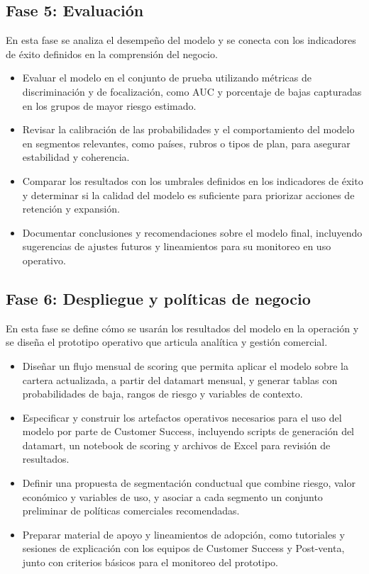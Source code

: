 \subsection{Fase 5: Evaluación}

En esta fase se analiza el desempeño del modelo y se conecta con los indicadores de éxito definidos en la comprensión del negocio.

\begin{itemize}
    \item Evaluar el modelo en el conjunto de prueba utilizando métricas de discriminación y de focalización, como AUC y porcentaje de bajas capturadas en los grupos de mayor riesgo estimado.
    \item Revisar la calibración de las probabilidades y el comportamiento del modelo en segmentos relevantes, como países, rubros o tipos de plan, para asegurar estabilidad y coherencia.
    \item Comparar los resultados con los umbrales definidos en los indicadores de éxito y determinar si la calidad del modelo es suficiente para priorizar acciones de retención y expansión.
    \item Documentar conclusiones y recomendaciones sobre el modelo final, incluyendo sugerencias de ajustes futuros y lineamientos para su monitoreo en uso operativo.
\end{itemize}

\subsection{Fase 6: Despliegue y políticas de negocio}

En esta fase se define cómo se usarán los resultados del modelo en la operación y se diseña el prototipo operativo que articula analítica y gestión comercial.

\begin{itemize}
    \item Diseñar un flujo mensual de scoring que permita aplicar el modelo sobre la cartera actualizada, a partir del datamart mensual, y generar tablas con probabilidades de baja, rangos de riesgo y variables de contexto.
    \item Especificar y construir los artefactos operativos necesarios para el uso del modelo por parte de Customer Success, incluyendo scripts de generación del datamart, un notebook de scoring y archivos de Excel para revisión de resultados.
    \item Definir una propuesta de segmentación conductual que combine riesgo, valor económico y variables de uso, y asociar a cada segmento un conjunto preliminar de políticas comerciales recomendadas.
    \item Preparar material de apoyo y lineamientos de adopción, como tutoriales y sesiones de explicación con los equipos de Customer Success y Post-venta, junto con criterios básicos para el monitoreo del prototipo.
\end{itemize}

